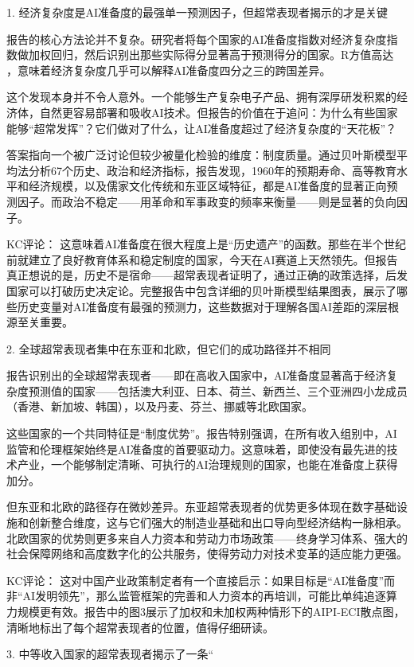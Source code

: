\documentclass[11pt]{ctexart}
\begin{document}
1. 经济复杂度是AI准备度的最强单一预测因子，但超常表现者揭示的才是关键

报告的核心方法论并不复杂。研究者将每个国家的AI准备度指数对经济复杂度指数做加权回归，然后识别出那些实际得分显著高于预测得分的国家。R方值高达 ，意味着经济复杂度几乎可以解释AI准备度四分之三的跨国差异。

这个发现本身并不令人意外。一个能够生产复杂电子产品、拥有深厚研发积累的经济体，自然更容易部署和吸收AI技术。但报告的价值在于追问：为什么有些国家能够“超常发挥”？它们做对了什么，让AI准备度超过了经济复杂度的“天花板”？

答案指向一个被广泛讨论但较少被量化检验的维度：制度质量。通过贝叶斯模型平均法分析67个历史、政治和经济指标，报告发现，1960年的预期寿命、高等教育水平和经济规模，以及儒家文化传统和东亚区域特征，都是AI准备度的显著正向预测因子。而政治不稳定——用革命和军事政变的频率来衡量——则是显著的负向因子。

KC评论： 这意味着AI准备度在很大程度上是“历史遗产”的函数。那些在半个世纪前就建立了良好教育体系和稳定制度的国家，今天在AI赛道上天然领先。但报告真正想说的是，历史不是宿命——超常表现者证明了，通过正确的政策选择，后发国家可以打破历史决定论。完整报告中包含详细的贝叶斯模型结果图表，展示了哪些历史变量对AI准备度有最强的预测力，这些数据对于理解各国AI差距的深层根源至关重要。

2. 全球超常表现者集中在东亚和北欧，但它们的成功路径并不相同

报告识别出的全球超常表现者——即在高收入国家中，AI准备度显著高于经济复杂度预测值的国家——包括澳大利亚、日本、荷兰、新西兰、三个亚洲四小龙成员（香港、新加坡、韩国），以及丹麦、芬兰、挪威等北欧国家。

这些国家的一个共同特征是“制度优势”。报告特别强调，在所有收入组别中，AI监管和伦理框架始终是AI准备度的首要驱动力。这意味着，即使没有最先进的技术产业，一个能够制定清晰、可执行的AI治理规则的国家，也能在准备度上获得加分。

但东亚和北欧的路径存在微妙差异。东亚超常表现者的优势更多体现在数字基础设施和创新整合维度，这与它们强大的制造业基础和出口导向型经济结构一脉相承。北欧国家的优势则更多来自人力资本和劳动力市场政策——终身学习体系、强大的社会保障网络和高度数字化的公共服务，使得劳动力对技术变革的适应能力更强。

KC评论： 这对中国产业政策制定者有一个直接启示：如果目标是“AI准备度”而非“AI发明领先”，那么监管框架的完善和人力资本的再培训，可能比单纯追逐算力规模更有效。报告中的图3展示了加权和未加权两种情形下的AIPI-ECI散点图，清晰地标出了每个超常表现者的位置，值得仔细研读。

3. 中等收入国家的超常表现者揭示了一条“
\end{document}
